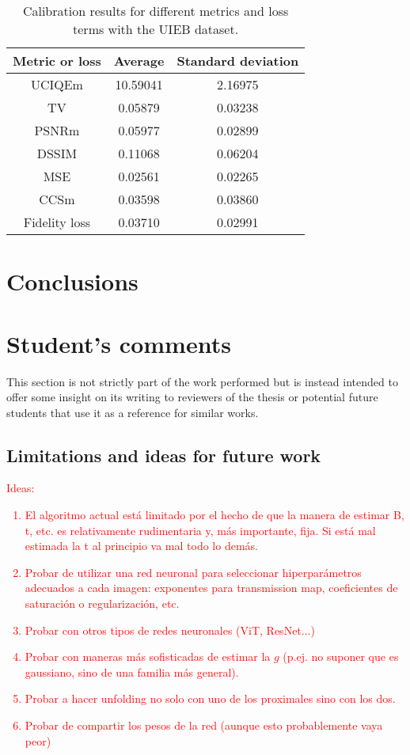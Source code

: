 \documentclass[twocolumn,twoside,a4paper,10pt]{IEEEtran}
\newcommand{\Frank}[1]{\textcolor{red}{#1}}
\begin{document}
\begin{table}[h]
\centering
\caption{Calibration results for different metrics and loss terms with the UIEB dataset.}
\begin{tabular}{|c|c|c|}
\hline
\textbf{Metric or loss} & \textbf{Average} & \textbf{Standard deviation} \\ \hline
UCIQEm                  & 10.59041         & 2.16975                     \\ \hline
TV                      & 0.05879          & 0.03238                     \\ \hline
PSNRm                   & 0.05977          & 0.02899                     \\ \hline
DSSIM                   & 0.11068          & 0.06204                     \\ \hline
MSE                     & 0.02561          & 0.02265                     \\ \hline
CCSm                    & 0.03598          & 0.03860                     \\ \hline
Fidelity loss           & 0.03710          & 0.02991                     \\ \hline
\end{tabular}
\end{table}


\section{Conclusions}

\section{Student's comments}
This section is not strictly part of the work performed but is instead intended to offer some insight on its writing to reviewers of the thesis or potential future students that use it as a reference for similar works.
\subsection{Limitations and ideas for future work}
\Frank{
Ideas:
\begin{enumerate}
  \item El algoritmo actual está limitado por el hecho de que la manera de estimar B, t, etc. es relativamente rudimentaria y, más importante, fija. Si está mal estimada la t al principio va mal todo lo demás.
  \item Probar de utilizar una red neuronal para seleccionar hiperparámetros adecuados a cada imagen: exponentes para transmission map, coeficientes de saturación o regularización, etc.
  \item Probar con otros tipos de redes neuronales (ViT, ResNet...)
  \item Probar con maneras más sofisticadas de estimar la \(g\) (p.ej. no suponer que es gaussiano, sino de una familia más general).
  \item Probar a hacer unfolding no solo con uno de los proximales sino con los dos.
  \item Probar de compartir los pesos de la red (aunque esto probablemente vaya peor)
\end{enumerate}
}
\end{document}
